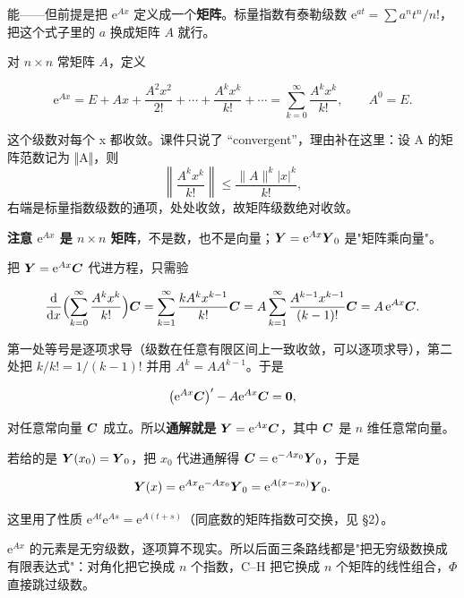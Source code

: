 \documentclass[11pt]{ctexart}
\begin{document}
能——但前提是把 $\mathrm{e}^{Ax}$ 定义成一个\textbf{矩阵}。标量指数有泰勒级数 $\mathrm{e}^{at}=\sum a^nt^n/n!$，把这个式子里的 $a$ 换成矩阵 $A$ 就行。


对 $n\times n$ 常矩阵 $A$，定义

\[
\mathrm{e}^{Ax}=E+Ax+\frac{A^2x^2}{2!}+\cdots+\frac{A^kx^k}{k!}+\cdots=\sum_{k=0}^{\infty}\frac{A^kx^k}{k!},
\qquad A^0=E .
\]

这个级数对每个 x 都收敛。课件只说了 “convergent”，理由补在这里：设 A 的矩阵范数记为 ‖A‖，则
\[
\left\|\frac{A^kx^k}{k!}\right\|\le\frac{\|A\|^k|x|^k}{k!},
\]
右端是标量指数级数的通项，处处收敛，故矩阵级数绝对收敛。

\textbf{注意 $\mathrm{e}^{Ax}$ 是 $n\times n$ 矩阵}，不是数，也不是向量；$\boldsymbol{Y}=\mathrm{e}^{Ax}\boldsymbol{Y}_0$ 是"矩阵乘向量"。


把 $\boldsymbol{Y}=\mathrm{e}^{Ax}\boldsymbol{C}$ 代进方程，只需验

\[
\frac{\mathrm{d}}{\mathrm{d}x}\Bigl(\sum_{k=0}^{\infty}\frac{A^kx^k}{k!}\Bigr)\boldsymbol{C}
=\sum_{k=1}^{\infty}\frac{kA^kx^{k-1}}{k!}\boldsymbol{C}
=A\sum_{k=1}^{\infty}\frac{A^{k-1}x^{k-1}}{(k-1)!}\boldsymbol{C}
=A\,\mathrm{e}^{Ax}\boldsymbol{C}.
\]

第一处等号是逐项求导（级数在任意有限区间上一致收敛，可以逐项求导），第二处把 $k/k!=1/(k-1)!$ 并用 $A^k=AA^{k-1}$。于是

\[
\bigl(\mathrm{e}^{Ax}\boldsymbol{C}\bigr)'-A\mathrm{e}^{Ax}\boldsymbol{C}=\boldsymbol{0},
\]

对任意常向量 $\boldsymbol{C}$ 成立。所以\textbf{通解就是} $\boldsymbol{Y}=\mathrm{e}^{Ax}\boldsymbol{C}$，其中 $\boldsymbol{C}$ 是 $n$ 维任意常向量。


若给的是 $\boldsymbol{Y}(x_0)=\boldsymbol{Y}_0$，把 $x_0$ 代进通解得 $\boldsymbol{C}=\mathrm{e}^{-Ax_0}\boldsymbol{Y}_0$，于是

\[
\boldsymbol{Y}(x)=\mathrm{e}^{Ax}\mathrm{e}^{-Ax_0}\boldsymbol{Y}_0=\mathrm{e}^{A(x-x_0)}\boldsymbol{Y}_0 .
\]

这里用了性质 $\mathrm{e}^{At}\mathrm{e}^{As}=\mathrm{e}^{A(t+s)}$（同底数的矩阵指数可交换，见 §2）。


$\mathrm{e}^{Ax}$ 的元素是无穷级数，逐项算不现实。所以后面三条路线都是"把无穷级数换成有限表达式"：对角化把它换成 $n$ 个指数，C--H 把它换成 $n$ 个矩阵的线性组合，$\Phi$ 直接跳过级数。
\end{document}
